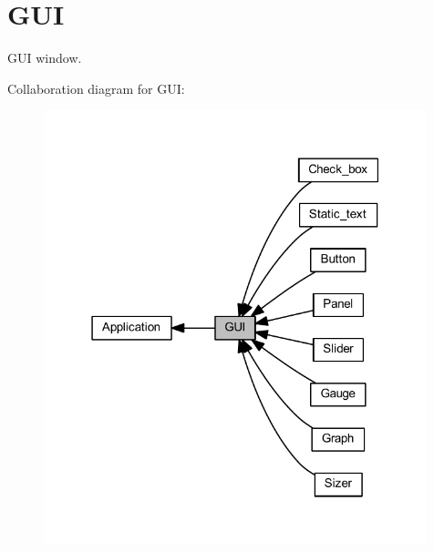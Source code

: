 \section{G\+UI}
\label{group___g_u_i}


G\+UI window.  


Collaboration diagram for G\+UI\+:
\nopagebreak
\begin{figure}[H]
\begin{center}
\leavevmode
\includegraphics[width=315pt]{group___g_u_i}
\end{center}
\end{figure}
